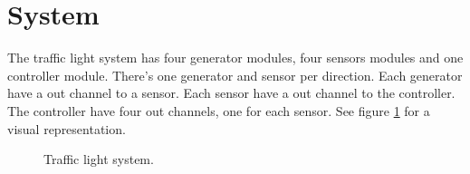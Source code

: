 \section{System}
The traffic light system has four generator modules, four sensors modules and one controller module. There's one generator and sensor per direction. Each generator have a out channel to a sensor. Each sensor have a out channel to the controller. The controller have four out channels, one for each sensor. See figure \ref{fig:sys} for a visual representation.

\bigskip

\begin{figure}[h!]
  \caption{Traffic light system.}
  \label{fig:sys}
\end{figure}
